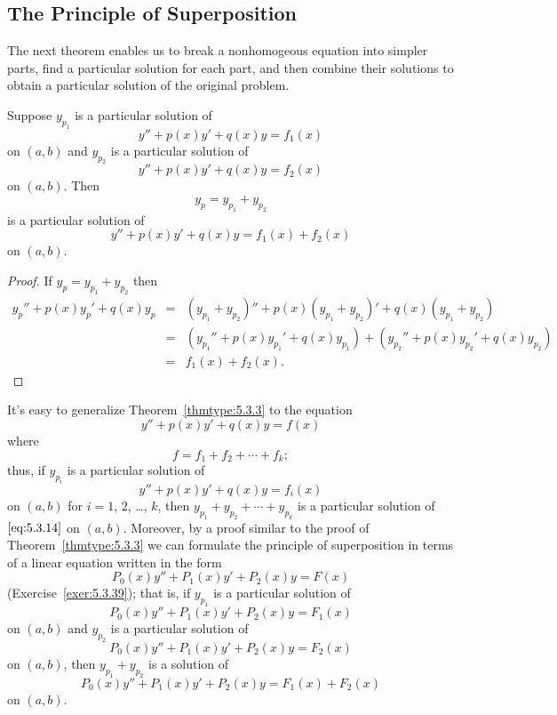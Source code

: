 \documentclass{ximera}
\begin{document}
\subsection*{The Principle of Superposition}
 
The next theorem enables us to break a nonhomogeous equation into
simpler parts, find a particular solution for each part, and then
combine their solutions to obtain a particular solution of the
original problem.
 
\begin{theorem}
\label{thmtype:5.3.3}
Suppose  $y_{p_1}$ is a particular solution of
$$
y''+p(x)y'+q(x)y=f_1(x)
$$
on $(a,b)$ and $y_{p_2}$ is a particular solution of
$$
y''+p(x)y'+q(x)y=f_2(x)
$$
on   $(a,b)$.
 Then
$$
y_p=y_{p_1}+y_{p_2}
$$
is a particular  solution of
$$
y''+p(x)y'+q(x)y=f_1(x)+f_2(x)
$$
on  $(a,b)$.
\end{theorem}
 
\begin{proof} If $y_p=y_{p_1}+y_{p_2}$ then
\begin{eqnarray*}
y_p''+p(x)y_p'+q(x)y_p&=&(y_{p_1}+y_{p_2})''+p(x)(y_{p_1}+y_{p_2})'
+q(x)(y_{p_1}+y_{p_2})\\
&=&\left(y_{p_1}''+p(x)y_{p_1}'+q(x)y_{p_1}\right)
+\left(y_{p_2}''+p(x)y_{p_2}'+q(x)y_{p_2}\right)\\
&=&f_1(x)+f_2(x).
\end{eqnarray*}
\end{proof}
 
 
It's easy to generalize  Theorem~\ref{thmtype:5.3.3}
to the equation
\begin{equation} \label{eq:5.3.14}
y''+p(x)y'+q(x)y=f(x)
\end{equation}
where
$$
f=f_1+f_2+\cdots+f_k;
$$
thus, if $y_{p_i}$ is a particular solution of
$$
y''+p(x)y'+q(x)y=f_i(x)
$$
on $(a,b)$ for $i=1$, $2$, \dots, $k$, then
$y_{p_1}+y_{p_2}+\cdots+y_{p_k}$
is a particular solution of $\eqref{eq:5.3.14}$ on $(a,b)$. Moreover, by a
proof similar to the proof of Theorem~\ref{thmtype:5.3.3} we can formulate
the principle of superposition in terms of a linear equation written
in the form
$$
P_0(x)y''+P_1(x)y'+P_2(x)y=F(x)
$$
(Exercise~\ref{exer:5.3.39});
that is, if $y_{p_1}$
is a particular solution of
$$
P_0(x)y''+P_1(x)y'+P_2(x)y=F_1(x)
$$
on $(a,b)$ and $y_{p_2}$ is a particular solution of
$$
P_0(x)y''+P_1(x)y'+P_2(x)y=F_2(x)
$$
on  $(a,b)$, then $y_{p_1}+y_{p_2}$ is a solution of
$$
P_0(x)y''+P_1(x)y'+P_2(x)y=F_1(x)+F_2(x)
$$
on $(a,b)$.
 
\end{document}
